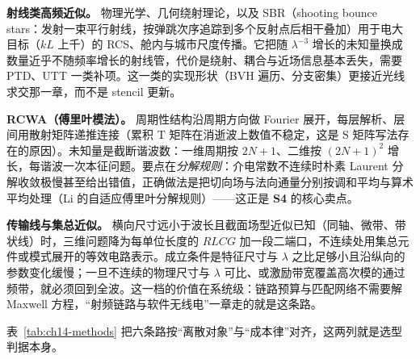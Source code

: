 \documentclass[12pt,a4paper,fontset=fandol]{ctexbook}
\newcommand{\Lib}[1]{\textbf{#1}}
\begin{document}
\textbf{射线类高频近似。} 物理光学、几何绕射理论，以及 SBR（shooting bounce stars：发射一束平行射线，按弹跳次序追踪到多个反射点后相干叠加）用于电大目标（$kL$ 上千）的 RCS、舱内与城市尺度传播。它把随 $\lambda^{-3}$ 增长的未知量换成数量近乎不随频率增长的射线管，代价是绕射、耦合与近场信息基本丢失，需要 PTD、UTT 一类补项。这一类的实现形状（BVH 遍历、分支密集）更接近光线求交那一章，而不是 stencil 更新。

\textbf{RCWA（傅里叶模法）。} 周期性结构沿周期方向做 Fourier 展开，每层解析、层间用散射矩阵递推连接（累积 T 矩阵在消逝波上数值不稳定，这是 S 矩阵写法存在的原因）。未知量是截断谐波数：一维周期按 $2N+1$、二维按 $(2N+1)^{2}$ 增长，每谐波一次本征问题。要点在\emph{分解规则}：介电常数不连续时朴素 Laurent 分解收敛极慢甚至给出错值，正确做法是把切向场与法向通量分别按调和平均与算术平均处理（Li 的自适应傅里叶分解规则）——这正是 \Lib{S4} 的核心卖点。

\textbf{传输线与集总近似。} 横向尺寸远小于波长且截面场型近似已知（同轴、微带、带状线）时，三维问题降为每单位长度的 $RLCG$ 加一段二端口，不连续处用集总元件或模式展开的等效电路表示。成立条件是特征尺寸与 $\lambda$ 之比足够小且沿纵向的参数变化缓慢；一旦不连续的物理尺寸与 $\lambda$ 可比、或激励带宽覆盖高次模的通过频带，就必须回到全波。这一档的价值在系统级：链路预算与匹配网络不需要解 Maxwell 方程，``射频链路与软件无线电''一章走的就是这条路。

\vspace{2pt}
\noindent
表~\ref{tab:ch14-methods} 把六条路按``离散对象''与``成本律''对齐，这两列就是选型判据本身。
\end{document}
